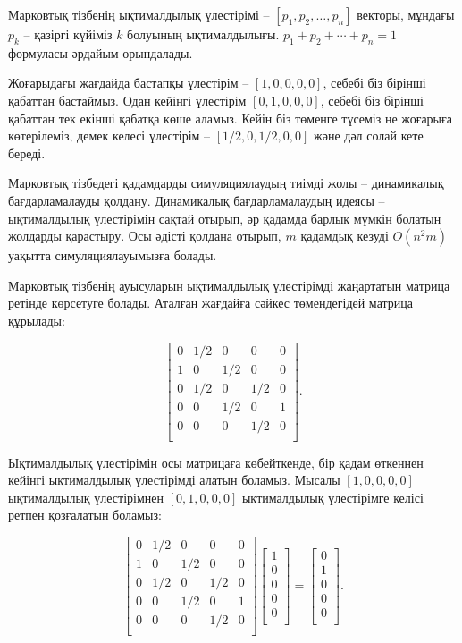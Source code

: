 Марковтық тізбенің ықтималдылық үлестірімі 
-- $[p_1,p_2,\ldots,p_n]$ векторы, мұндағы
$p_k$ -- қазіргі күйіміз $k$ болуының ықтималдылығы. 
$p_1+p_2+\cdots+p_n=1$ формуласы әрдайым орындалады. 

Жоғарыдағы жағдайда бастапқы үлестірім -- $[1,0,0,0,0]$,
себебі біз бірінші қабаттан бастаймыз. Одан кейінгі үлестірім
$[0,1,0,0,0]$, себебі біз бірінші қабаттан тек екінші қабатқа
көше аламыз. Кейін біз төменге түсеміз не жоғарыға көтерілеміз,
демек келесі үлестірім -- $[1/2,0,1/2,0,0]$ және дәл солай 
кете береді.

Марковтық тізбедегі қадамдарды симуляциялаудың тиімді жолы
-- динамикалық бағдарламалауды қолдану.  
Динамикалық бағдарламалаудың идеясы -- 
ықтималдылық үлестірімін сақтай отырып,
әр қадамда барлық мүмкін болатын жолдарды қарастыру.  
Осы әдісті қолдана отырып, $m$ қадамдық кезуді $O(n^2 m)$ уақытта
симуляциялауымызға болады. 

Марковтық тізбенің ауысуларын ықтималдылық үлестірімді жаңартатын
матрица ретінде көрсетуге болады. Аталған жағдайға сәйкес төмендегідей матрица құрылады:

\[ 
 \begin{bmatrix}
  0 & 1/2 & 0 & 0 & 0 \\
  1 & 0 & 1/2 & 0 & 0 \\
  0 & 1/2 & 0 & 1/2 & 0 \\
  0 & 0 & 1/2 & 0 & 1 \\
  0 & 0 & 0 & 1/2 & 0 \\
 \end{bmatrix}.
\]

Ықтималдылық үлестірімін осы матрицаға көбейткенде, 
бір қадам өткеннен кейінгі ықтималдылық үлестірімді 
алатын боламыз. Мысалы $[1,0,0,0,0]$ ықтималдылық үлестірімнен
$[0,1,0,0,0]$ ықтималдылық үлестірімге келісі ретпен қозғалатын боламыз:

\[ 
 \begin{bmatrix}
  0 & 1/2 & 0 & 0 & 0 \\
  1 & 0 & 1/2 & 0 & 0 \\
  0 & 1/2 & 0 & 1/2 & 0 \\
  0 & 0 & 1/2 & 0 & 1 \\
  0 & 0 & 0 & 1/2 & 0 \\
 \end{bmatrix}
 \begin{bmatrix}
  1 \\
  0 \\
  0 \\
  0 \\
  0 \\
 \end{bmatrix}
=
 \begin{bmatrix}
  0 \\
  1 \\
  0 \\
  0 \\
  0 \\
 \end{bmatrix}.
\]

